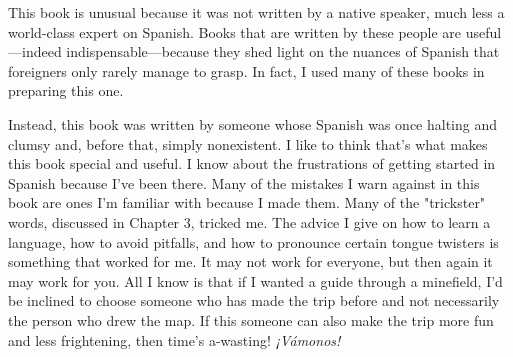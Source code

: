This book is unusual because it was not written by a native
speaker, much less a world-class expert on Spanish. Books that are
written by these people are useful---indeed indispensable---because
they shed light on the nuances of Spanish that foreigners only rarely
manage to grasp. In fact, I used many of these books in preparing
this one.

Instead, this book was written by someone whose Spanish was
once halting and clumsy and, before that, simply nonexistent. I like to
think that's what makes this book special and useful. I know about the
frustrations of getting started in Spanish because I've been there. Many
of the mistakes I warn against in this book are ones I'm familiar with
because I made them. Many of the "trickster" words, discussed in
Chapter 3, tricked me. The advice I give on how to learn a language,
how to avoid pitfalls, and how to pronounce certain tongue twisters
is something that worked for me. It may not work for everyone, but
then again it may work for you. All I know is that if I wanted a guide
through a minefield, I'd be inclined to choose someone who has made
the trip before and not necessarily the person who drew the map. If
this someone can also make the trip more fun and less frightening,
then time's a-wasting! \emph{¡Vámonos!}
